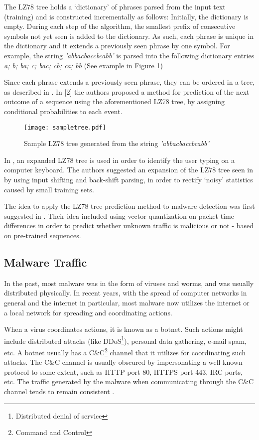 \documentclass[13pt,journal,compsoc,onecolumn]{IEEEtran}
\begin{document}
The LZ78 tree holds a ‘dictionary’ of phrases parsed from the input text (training) and is constructed incrementally as follows:
Initially, the dictionary is empty. During each step of the algorithm, the smallest prefix of consecutive symbols not yet seen is added to the dictionary. As such, each phrase is unique in the dictionary and it extends a previously seen phrase by one symbol.
For example, the string \emph{'abbacbaccbcabb'} is parsed into the following dictionary entries \emph{a; b; ba; c; bac; cb; ca; bb} (See example in Figure \ref{fig:lztree})

Since each phrase extends a previously seen phrase, they can be ordered in a tree, as described in \cite{Lan83}. In [2] the authors proposed a method for prediction of the next outcome of a sequence using the aforementioned LZ78 tree, by assigning conditional probabilities to each event.
\begin{figure}[!ht]
 \centering
 \texttt{[image: sampletree.pdf]}
 \caption{Sample LZ78 tree generated from the string \emph{'abbacbaccbcabb'}\label{fig:lztree}}
\end{figure} 
In \cite{Nis03}, an expanded LZ78 tree is used in order to identify the user typing on a computer keyboard. The authors suggested an expansion of the LZ78 tree seen in \cite{Lan83} by using input shifting and back-shift parsing, in order to rectify ‘noisy’ statistics caused by small training sets.

The idea to apply the LZ78 tree prediction method to malware detection was first suggested in \cite{Coh12}. Their idea included using vector quantization on packet time differences in order to predict whether unknown traffic is malicious or not - based on pre-trained sequences.


\subsection{Malware Traffic}
\label{sec:malwaretraffic}
In the past, most malware was in the form of viruses and worms, and was usually distributed physically. In recent years, with the spread of computer networks in general and the internet in particular, most malware now utilizes the internet or a local network for spreading and coordinating actions.

When a virus coordinates actions, it is known as a botnet. Such actions might include distributed attacks (like DDoS\footnote{Distributed denial of service}), personal data gathering, e-mail spam, etc. A botnet usually has a C\&C\footnote{Command and Control} channel that it utilizes for coordinating such attacks.
The C\&C channel is usually obscured by impersonating a well-known protocol to some extent, such as HTTP port 80, HTTPS port 443, IRC ports, etc.
The traffic generated by the malware when communicating through the C\&C channel tends to remain consistent \cite{Vil12}.
\end{document}
